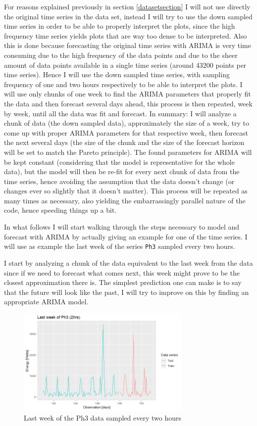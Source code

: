 \documentclass[12pt,a4paper,titlepage]{report}
\begin{document}
For reasons explained previously in section \ref{datasetsection} I will not use directly the original time series in the data set, instead I will try to use the down sampled time series in order to be able to properly interpret the plots, since the high frequency time series yields plots that are way too dense to be interpreted. Also this is done because forecasting the original time series with ARIMA is very time consuming due to the high frequency of the data points and due to the sheer amount of data points available in a single time series (around 43200 points per time series). Hence I will use the down sampled time series, with sampling frequency of one and two hours respectively to be able to interpret the plots. I will use only chunks of one week to find the ARIMA parameters that properly fit the data and then forecast several days ahead, this process is then repeated, week by week, until all the data was fit and forecast. In summary: I will analyze a chunk of data (the down sampled data), approximately the size of a week, try to come up with proper ARIMA parameters for that respective week, then forecast the next several days (the size of the chunk and the size of the forecast horizon will be set to match the Pareto principle). The found parameters for ARIMA will be kept constant (considering that the model is representative for the whole data), but the model will then be re-fit for every next chunk of data from the time series, hence avoiding the assumption that the data doesn't change (or changes ever so slightly that it doesn't matter). This process will be repeated as many times as necessary, also yielding the embarrassingly parallel nature of the code, hence speeding things up a bit.

In what follows I will start walking through the steps necessary to model and forecast with ARIMA by actually giving an example for one of the time series. I will use as example the last week of the series \texttt{Ph3} sampled every two hours.

I start by analyzing a chunk of the data equivalent to the last week from the data since if we need to forecast what comes next, this week might prove to be the closest approximation there is. The simplest prediction one can make is to say that the future will look like the past, I will try to improve on this by finding an appropriate ARIMA model.

\begin{figure}[h]
    \centering
    \includegraphics[width=0.75\textwidth]{dlastweek2hrsph3}
    \caption{Last week of the Ph3 data sampled every two hours}
    \label{dlastweek2hrsph3}
\end{figure}
\end{document}
